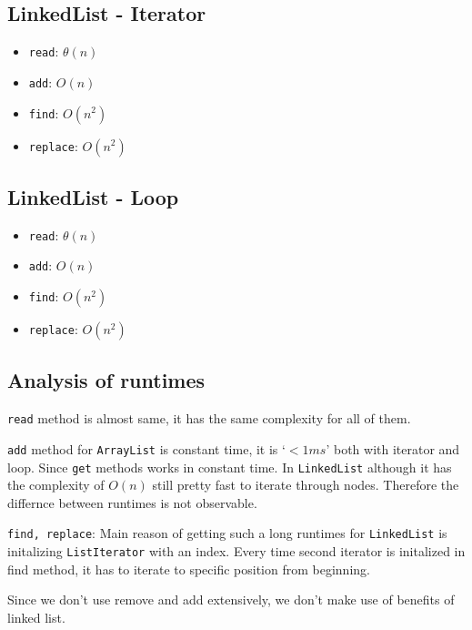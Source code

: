 \documentclass[a4paper]{article}
\begin{document}
\begin{large}
\subsection*{LinkedList - Iterator}
\begin{itemize}
  \item \texttt{read}: $\theta(n)$
  \item \texttt{add}: $O(n)$
  \item \texttt{find}: $O(n^2)$
  \item \texttt{replace}: $O(n^2)$
\end{itemize}

\subsection*{LinkedList - Loop}
\begin{itemize}
  \item \texttt{read}: $\theta(n)$
  \item \texttt{add}: $O(n)$
  \item \texttt{find}: $O(n^2)$
  \item \texttt{replace}: $O(n^2)$
\end{itemize}

\newpage

\subsection{Analysis of runtimes}

\texttt{read} method is almost same, it has the same complexity for all of them.
\vspace{1em}

\texttt{add} method for \texttt{ArrayList} is constant time, it is `$< 1ms$' both with iterator and loop. Since \texttt{get} methods works in constant time. In \texttt{LinkedList} although it has the complexity of $O(n)$ still pretty fast to iterate through nodes. Therefore the differnce between runtimes is not observable.
\vspace{1em}

\texttt{find, replace}: Main reason of getting such a long runtimes for \texttt{LinkedList} is initalizing \texttt{ListIterator} with an index. Every time second iterator is initalized in find method, it has to iterate to specific position from beginning.
\vspace{1em}

Since we don't use remove and add extensively, we don't make use of benefits of linked list.
\vspace{1em}


\end{large}
\end{document}
